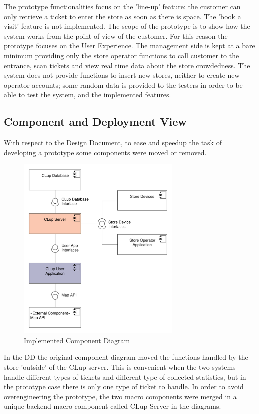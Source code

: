 The prototype functionalities focus on the 'line-up' feature: the customer can only retrieve a ticket to enter the store as soon as there is space. The 'book a visit' feature is not implemented.
The scope of the prototype is to show how the system works from the point of view of the customer. For this reason the prototype focuses on the User Experience. The management side is kept at a bare minimum providing only the store operator functions to call customer to the entrance, scan tickets and view real time data about the store crowdedness. The system does not provide functions to insert new stores, neither to create new operator accounts; some random data is provided to the testers in order to be able to test the system, and the implemented features.

\subsection{Component and Deployment View}
With respect to the Design Document, to ease and speedup the task of developing a prototype some components were moved or removed.
\begin{figure}[H]
    \centering
    \includegraphics[width=0.7\textwidth]{Images/UML_general_component.pdf}
    \caption{\label{fig:General Component}Implemented Component Diagram}
\end{figure}

\clearpage

In the DD the original component diagram moved the functions handled by the store 'outside' of the CLup server. This is convenient when the two systems handle different types of tickets and different type of collected statistics, but in the prototype case there is only one type of ticket to handle. In order to avoid overengineering the prototype, the two macro components were merged in a unique backend macro-component called CLup Server in the diagrams.

